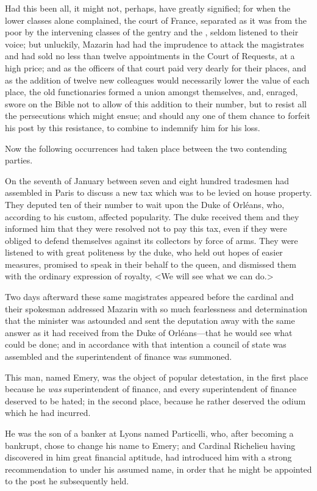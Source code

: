 Had this been all, it might not, perhaps, have greatly signified; for when the lower classes alone complained, the court of France, separated as it was from the poor by the intervening classes of the gentry and the , seldom listened to their voice; but unluckily, Mazarin had had the imprudence to attack the magistrates and had sold no less than twelve appointments in the Court of Requests, at a high price; and as the officers of that court paid very dearly for their places, and as the addition of twelve new colleagues would necessarily lower the value of each place, the old functionaries formed a union amongst themselves, and, enraged, swore on the Bible not to allow of this addition to their number, but to resist all the persecutions which might ensue; and should any one of them chance to forfeit his post by this resistance, to combine to indemnify him for his loss.

Now the following occurrences had taken place between the two contending parties.

On the seventh of January between seven and eight hundred tradesmen had assembled in Paris to discuss a new tax which was to be levied on house property. They deputed ten of their number to wait upon the Duke of Orléans, who, according to his custom, affected popularity. The duke received them and they informed him that they were resolved not to pay this tax, even if they were obliged to defend themselves against its collectors by force of arms. They were listened to with great politeness by the duke, who held out hopes of easier measures, promised to speak in their behalf to the queen, and dismissed them with the ordinary expression of royalty, <We will see what we can do.>

Two days afterward these same magistrates appeared before the cardinal and their spokesman addressed Mazarin with so much fearlessness and determination that the minister was astounded and sent the deputation away with the same answer as it had received from the Duke of Orléans—that he would see what could be done; and in accordance with that intention a council of state was assembled and the superintendent of finance was summoned.

This man, named Emery, was the object of popular detestation, in the first place because he \emph{was} superintendent of finance, and every superintendent of finance deserved to be hated; in the second place, because he rather deserved the odium which he had incurred.

He was the son of a banker at Lyons named Particelli, who, after becoming a bankrupt, chose to change his name to Emery; and Cardinal Richelieu having discovered in him great financial aptitude, had introduced him with a strong recommendation to  under his assumed name, in order that he might be appointed to the post he subsequently held.


